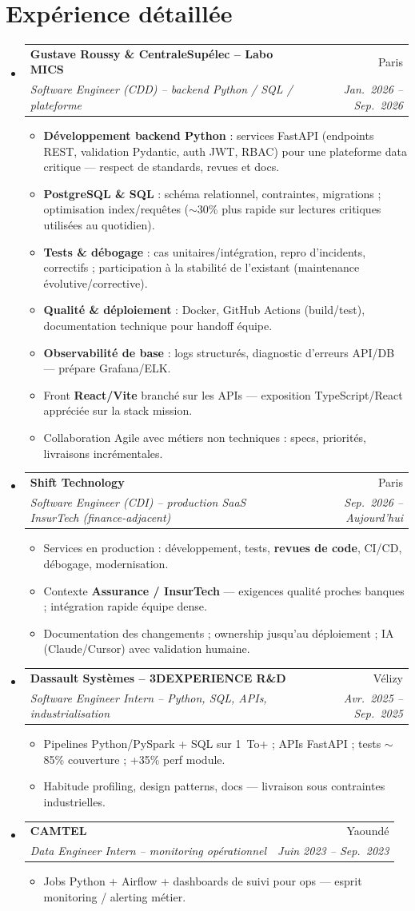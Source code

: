 \documentclass[a4paper,10.5pt]{article}
\makeatletter
\newcommand{\resumeItem}[1]{\item\small{#1}}
\newcommand{\resumeSubheading}[4]{\vspace{2.5pt}\item\begin{tabular*}{0.97\textwidth}[t]{l@{\extracolsep{\fill}}r}\textbf{#1}&{#2}\\\textit{\small #3}&\textit{\small #4}\\\end{tabular*}\vspace{1pt}}
\newcommand{\resumeSubHeadingListStart}{\begin{itemize}[leftmargin=0.08in,label={}]}
\newcommand{\resumeSubHeadingListEnd}{\end{itemize}}
\makeatother
\begin{document}
\section{Exp\'erience d\'etaill\'ee}
\resumeSubHeadingListStart
  \resumeSubheading
    {Gustave Roussy \& CentraleSup\'elec -- Labo MICS}{Paris}
    {Software Engineer (CDD) -- backend Python / SQL / plateforme}{Jan.~2026 -- Sep.~2026}
    \begin{itemize}
      \resumeItem{\textbf{D\'eveloppement backend Python} : services FastAPI (endpoints REST, validation Pydantic, auth JWT, RBAC) pour une plateforme data critique --- respect de standards, revues et docs.}
      \resumeItem{\textbf{PostgreSQL \& SQL} : sch\'ema relationnel, contraintes, migrations ; optimisation index/requ\^etes ($\sim$30\% plus rapide sur lectures critiques utilis\'ees au quotidien).}
      \resumeItem{\textbf{Tests \& d\'ebogage} : cas unitaires/int\'egration, repro d'incidents, correctifs ; participation \`a la stabilit\'e de l'existant (maintenance \'evolutive/corrective).}
      \resumeItem{\textbf{Qualit\'e \& d\'eploiement} : Docker, GitHub Actions (build/test), documentation technique pour handoff \'equipe.}
      \resumeItem{\textbf{Observabilit\'e de base} : logs structur\'es, diagnostic d'erreurs API/DB --- pr\'epare Grafana/ELK.}
      \resumeItem{Front \textbf{React/Vite} branch\'e sur les APIs --- exposition TypeScript/React appr\'eci\'ee sur la stack mission.}
      \resumeItem{Collaboration Agile avec m\'etiers non techniques : specs, priorit\'es, livraisons incr\'ementales.}
    \end{itemize}
  \resumeSubheading
    {Shift Technology}{Paris}
    {Software Engineer (CDI) -- production SaaS InsurTech (finance-adjacent)}{Sep.~2026 -- Aujourd'hui}
    \begin{itemize}
      \resumeItem{Services en production : d\'eveloppement, tests, \textbf{revues de code}, CI/CD, d\'ebogage, modernisation.}
      \resumeItem{Contexte \textbf{Assurance / InsurTech} --- exigences qualit\'e proches banques ; int\'egration rapide \'equipe dense.}
      \resumeItem{Documentation des changements ; ownership jusqu'au d\'eploiement ; IA (Claude/Cursor) avec validation humaine.}
    \end{itemize}
  \resumeSubheading
    {Dassault Syst\`emes -- 3DEXPERIENCE R\&D}{V\'elizy}
    {Software Engineer Intern -- Python, SQL, APIs, industrialisation}{Avr.~2025 -- Sep.~2025}
    \begin{itemize}
      \resumeItem{Pipelines Python/PySpark + SQL sur 1~To+ ; APIs FastAPI ; tests $\sim$85\% couverture ; +35\% perf module.}
      \resumeItem{Habitude profiling, design patterns, docs --- livraison sous contraintes industrielles.}
    \end{itemize}
  \resumeSubheading
    {CAMTEL}{Yaound\'e}
    {Data Engineer Intern -- monitoring op\'erationnel}{Juin 2023 -- Sep.~2023}
    \begin{itemize}
      \resumeItem{Jobs Python + Airflow + dashboards de suivi pour ops --- esprit monitoring / alerting m\'etier.}
    \end{itemize}
\resumeSubHeadingListEnd
\end{document}
